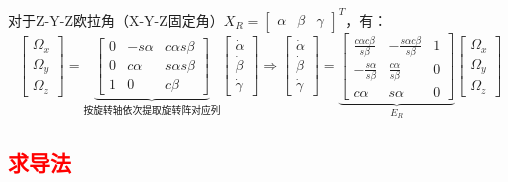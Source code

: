 \documentclass[
12pt, %
a4paper, 
oneside, %
]{scrartcl}
\begin{document}
\begin{itemize}
对于Z-Y-Z欧拉角（X-Y-Z固定角）$ X_R = \begin{bmatrix} \alpha & \beta & \gamma \end{bmatrix}^T $，有：
$$
\begin{bmatrix} \Omega_x \\ \Omega_y \\ \Omega_z \end{bmatrix}
= \underbrace{\begin{bmatrix} 0 & -s\alpha & c\alpha s\beta \\ 0 & c\alpha & s\alpha s\beta \\ 1 & 0 & c\beta \end{bmatrix}}_{\text{按旋转轴依次提取旋转阵对应列}} \begin{bmatrix} \dot{\alpha} \\ \dot{\beta} \\ \dot{\gamma} \end{bmatrix}
\Rightarrow \begin{bmatrix} \dot{\alpha} \\ \dot{\beta} \\ \dot{\gamma} \end{bmatrix}
= \underbrace{\begin{bmatrix} \frac{c\alpha c\beta}{s\beta} & -\frac{s\alpha c\beta}{s\beta} & 1 \\ -\frac{s\alpha}{s\beta} & \frac{c\alpha}{s\beta} & 0 \\ c\alpha & s\alpha & 0 \end{bmatrix}}_{E_R} \begin{bmatrix} \Omega_x \\ \Omega_y \\ \Omega_z \end{bmatrix}
$$
\end{itemize} 
\subsection[求导法]{\textcolor{red}{求导法}}
\end{document}
